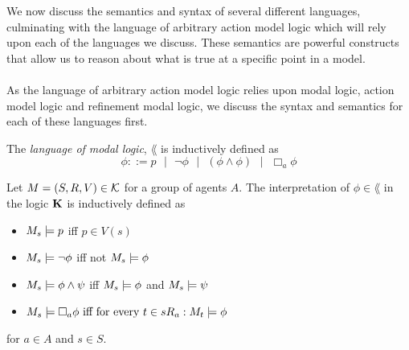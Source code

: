 We now discuss the semantics and syntax of several different languages, culminating with the language of
arbitrary action model logic which will rely upon each of the languages we discuss.
These semantics are powerful constructs that allow us to reason about what is true at a specific
point in a model.\\
\\
As the language of arbitrary action model logic relies upon modal logic, action model logic and
refinement modal logic, we discuss the syntax and semantics for each of these languages first.

\begin{defn} \label{modalLogic:syntax}
The {\em language of modal logic}, $\lang$ is inductively defined as
\[
	\phi ::= p \text{ } | \text{ } \neg \phi \text{ } | \text{ } (\phi \land \phi) \text{ } | \text{ } \Box_a \phi
\]
\end{defn}

\begin{defn} \label{modalLogic:semantics}
Let $M = (S, R, V) \in \mathcal{K}$ for a group of agents $A$.
The interpretation of $\phi \in \lang$ in the logic $\bf K$ is inductively defined as

\begin{itemize}
	\item $M_s \models p$ iff $p \in V(s)$
	\item $M_s \models \neg \phi$ iff not $M_s \models \phi$
	\item $M_s \models \phi \land \psi$ iff $M_s \models \phi$ and $M_s \models \psi$
	\item $M_s \models \Box_a \phi \text{ iff for every }t \in s R_a: M_t \models \phi$
\end{itemize}

for $a \in A$ and $s \in S$.
\end{defn}

